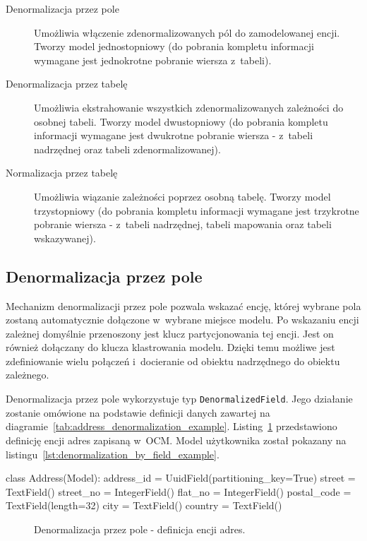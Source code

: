 \begin{description}
	\item[Denormalizacja przez pole] Umożliwia włączenie zdenormalizowanych pól do zamodelowanej encji. Tworzy model jednostopniowy (do pobrania kompletu informacji wymagane jest jednokrotne pobranie wiersza z~tabeli).
	\item[Denormalizacja przez tabelę] Umożliwia ekstrahowanie wszystkich zdenormalizowanych zależności do osobnej tabeli. Tworzy model dwustopniowy (do pobrania kompletu informacji wymagane jest dwukrotne pobranie wiersza - z~tabeli nadrzędnej oraz tabeli zdenormalizowanej).
	\item[Normalizacja przez tabelę] Umożliwia wiązanie zależności poprzez osobną tabelę. Tworzy model trzystopniowy (do pobrania kompletu informacji wymagane jest trzykrotne pobranie wiersza - z~tabeli nadrzędnej, tabeli mapowania oraz tabeli wskazywanej).
\end{description}

\subsection{Denormalizacja przez pole}

Mechanizm denormalizacji przez pole pozwala wskazać encję, której wybrane pola zostaną automatycznie dołączone w~wybrane miejsce modelu. Po wskazaniu encji zależnej domyślnie przenoszony jest klucz partycjonowania tej encji. Jest on również dołączany do klucza klastrowania modelu. Dzięki temu możliwe jest zdefiniowanie wielu połączeń i~docieranie od obiektu nadrzędnego do obiektu zależnego. 

Denormalizacja przez pole wykorzystuje typ \verb+DenormalizedField+. Jego działanie zostanie omówione na podstawie definicji danych zawartej na diagramie~\ref{tab:address_denormalization_example}. Listing~\ref{lst:denormalization_by_field_address_entity} przedstawiono definicję encji adres zapisaną w~OCM. Model użytkownika został pokazany na listingu~\ref{lst:denormalization_by_field_example}. 

\begin{verbbox}[\footnotesize]
class Address(Model):
    address_id = UuidField(partitioning_key=True)
    street = TextField()
    street_no = IntegerField()
    flat_no = IntegerField()
    postal_code = TextField(length=32)
    city = TextField()
    country = TextField()
\end{verbbox}

\begin{figure}[ht!]
	\centering
	\theverbbox
	\caption{Denormalizacja przez pole - definicja encji adres.}
	\label{lst:denormalization_by_field_address_entity}
\end{figure}

